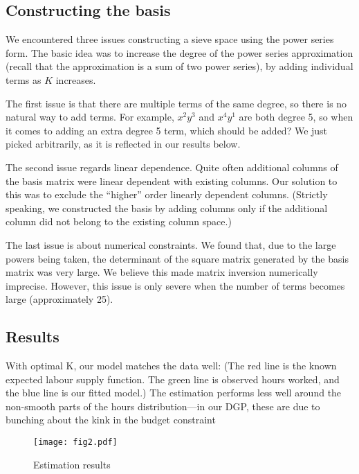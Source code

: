 \documentclass[11pt,letterpaper]{article}                  %
\begin{document}
\subsection{Constructing the basis}

We encountered three issues constructing a sieve space using the power series form.
The basic idea was to increase the degree of the power series approximation (recall that the approximation is a sum of two power series), by adding individual terms as $K$ increases.

The first issue is that there are multiple terms of the same degree, so there is no natural way to add terms.
For example, $x^2y^3$ and $x^4y^1$ are both degree 5, so when it comes to adding an extra degree 5 term, which should be added?
We just picked arbitrarily, as it is reflected in our results below.

The second issue regards linear dependence.
Quite often additional columns of the basis matrix were linear dependent with existing columns.
Our solution to this was to exclude the ``higher'' order linearly dependent columns.
(Strictly speaking, we constructed the basis by adding columns only if the additional column did not belong to the existing column space.)

The last issue is about numerical constraints.
We found that, due to the large powers being taken, the determinant of the square matrix generated by the basis matrix was very large.
We believe this made matrix inversion numerically imprecise.
However, this issue is only severe when the number of terms becomes large (approximately 25).



\subsection{Results}
\label{sec:ex1}

With optimal K, our model matches the data well: (The red line is the known expected labour supply function. The green
line is observed hours worked, and the blue line is our fitted model.)
 The estimation performs less well
around the non-smooth parts of the hours distribution---in our DGP,
these are due to bunching about the kink in the budget constraint
\begin{figure}[H]
	\centering
	\caption{Estimation results}
	\label{fig:est1}
	\texttt{[image: fig2.pdf]}
\end{figure}
\end{document}
